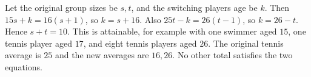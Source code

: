Let the original group sizes be $s,t$, and the switching player\textquotesingle s age be $k$. Then $15s+k=16(s+1)$, so $k=s+16$. Also $25t-k=26(t-1)$, so $k=26-t$. Hence $s+t=\boxed{10}$. This is attainable, for example with one swimmer aged $15$, one tennis player aged $17$, and eight tennis players aged $26$. The original tennis average is $25$ and the new averages are $16,26$. No other total satisfies the two equations.
